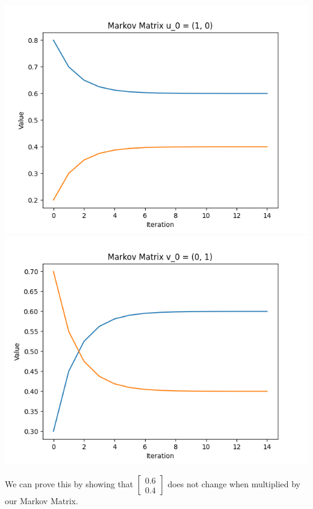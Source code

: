 \documentclass[12pt]{article}
\begin{document}
\includegraphics[scale=0.55]{s21p30a.png}
\includegraphics[scale=0.55]{s21p30b.png}

\noindent We can prove this by showing that $\begin{bmatrix} 0.6 \\ 0.4 \end{bmatrix}$ does not change when multiplied by our Markov Matrix.
\end{document}
